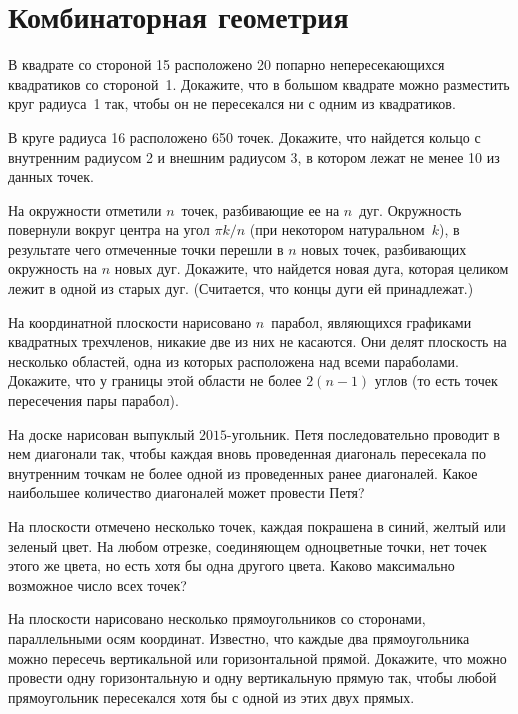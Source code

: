 
\section*{Комбинаторная геометрия}


\begin{problems}

\item
В квадрате со стороной 15 расположено 20 попарно непересекающихся квадратиков
со стороной~1.
Докажите, что в большом квадрате можно разместить круг радиуса~1 так, чтобы
он не пересекался ни с одним из квадратиков.  

\item
В круге радиуса 16 расположено 650 точек.
Докажите, что найдется кольцо с внутренним радиусом 2 и внешним радиусом 3,
в котором лежат не менее 10 из данных точек.

\item
На окружности отметили $n$~точек, разбивающие ее на $n$~дуг.
Окружность повернули вокруг центра на угол $\pi k / n$ (при некотором
натуральном~$k$), в результате чего отмеченные точки перешли в $n$ новых точек,
разбивающих окружность на $n$ новых дуг.
Докажите, что найдется новая дуга, которая целиком лежит в одной из старых дуг.
(Считается, что концы дуги ей принадлежат.)

\item
На координатной плоскости нарисовано $n$~парабол, являющихся графиками
квадратных трехчленов, никакие две из них не касаются.
Они делят плоскость на несколько областей, одна из которых расположена над
всеми параболами. 
Докажите, что у границы этой области не более $2 (n - 1)$ углов (то есть точек
пересечения пары парабол).

\item
На доске нарисован выпуклый $2015$-угольник.
Петя последовательно проводит в нем диагонали так, чтобы каждая вновь
проведенная диагональ пересекала по внутренним точкам не более одной
из проведенных ранее диагоналей.
Какое наибольшее количество диагоналей может провести Петя?

\item
На плоскости отмечено несколько точек, каждая покрашена в синий, желтый или
зеленый цвет. 
На любом отрезке, соединяющем одноцветные точки, нет точек этого же цвета,
но есть хотя бы одна другого цвета.
Каково максимально возможное число всех точек?

\item
На плоскости нарисовано несколько прямоугольников со сторонами, параллельными
осям координат. 
Известно, что каждые два прямоугольника можно пересечь вертикальной или
горизонтальной прямой.
Докажите, что можно провести одну горизонтальную и одну вертикальную прямую
так, чтобы любой прямоугольник пересекался хотя бы с одной из этих двух прямых.

\end{problems}

